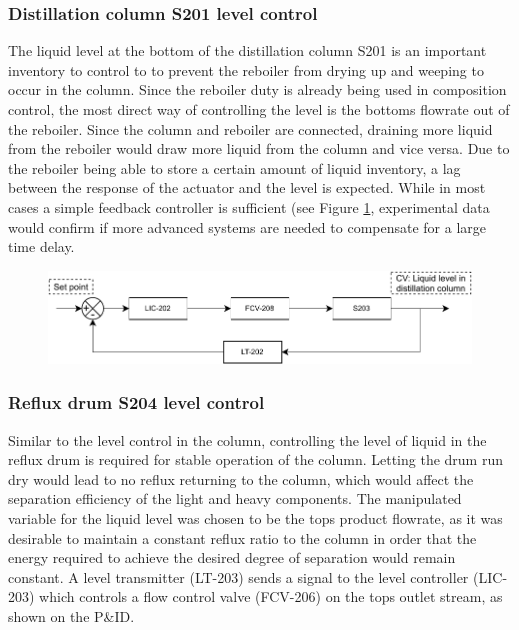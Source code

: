 \subsubsection{Distillation column S201 level control}
The liquid level at the bottom of the distillation column S201 is an important inventory to control to to prevent the reboiler from drying up and weeping to occur in the column. Since the reboiler duty is already being used in composition control, the most direct way of controlling the level is the bottoms flowrate out of the reboiler. Since the column and reboiler are connected, draining more liquid from the reboiler would draw more liquid from the column and vice versa. Due to the reboiler being able to store a certain amount of liquid inventory, a lag between the response of the actuator and the level is expected. While in most cases a simple feedback controller is sufficient (see Figure \ref{fig:S203-LC}, experimental data would confirm if more advanced systems are needed to compensate for a large time delay. 

\begin{figure}[H]
    \centering
    \includegraphics[width=\linewidth]{chapters/4-operation-control/4-Figures/S203-LC.pdf}
    \caption{}
    \label{fig:S203-LC}
\end{figure}


\subsubsection{Reflux drum S204 level control}
Similar to the level control in the column, controlling the level of liquid in the reflux drum is required for stable operation of the column. Letting the drum run dry would lead to no reflux returning to the column, which would affect the separation efficiency of the light and heavy components. The manipulated variable for the liquid level was chosen to be the tops product flowrate, as it was desirable to maintain a constant reflux ratio to the column in order that the energy required to achieve the desired degree of separation would remain constant. A level transmitter (LT-203) sends a signal to the level controller (LIC-203) which controls a flow control valve (FCV-206) on the tops outlet stream, as shown on the P\&ID. 



